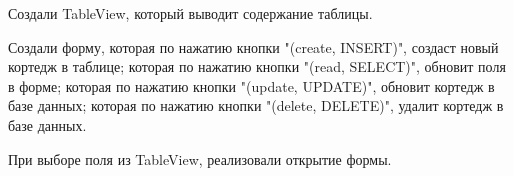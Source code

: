 \documentclass[12pt, a4paper, simple]{eskdtext}
\begin{document}
    Создали TableView, который выводит содержание таблицы.

    Создали форму,
    которая по нажатию кнопки "(create, INSERT)",
    создаст новый кортедж в таблице;
    которая по нажатию кнопки "(read, SELECT)",
    обновит поля в форме;
    которая по нажатию кнопки "(update, UPDATE)",
    обновит кортедж в базе данных;
    которая по нажатию кнопки "(delete, DELETE)",
    удалит кортедж в базе данных.

    При выборе поля из TableView, реализовали открытие формы.

    \newpage
\end{document}
